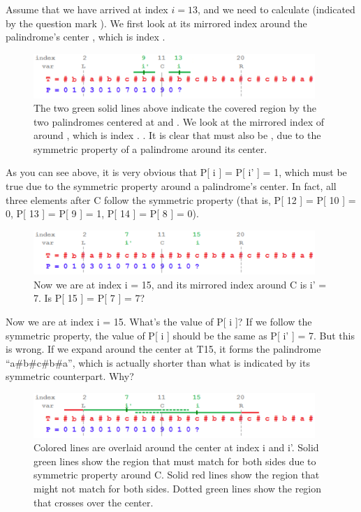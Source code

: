 Assume that we have arrived at index $i=13$, and we need to calculate
 (indicated by the question mark ). We first look at its
mirrored index  around the palindrome's center , which is
index .

\begin{figure}
\centering
\includegraphics[width=0.95\textwidth]{Images/figLCLngstPlndrmcSubstring2}
\caption{The two green solid lines above indicate the covered region by the
  two palindromes centered at  and . We look at the mirrored
  index of  around , which is index .
  . It is clear that  must also be , due
  to the symmetric property of a palindrome around its center.}
\end{figure}

As you can see above, it is very obvious that P[ i ] = P[ i' ] = 1, which
must be true due to the symmetric property around a palindrome's center. In
fact, all three elements after C follow the symmetric property (that is, P[
12 ] = P[ 10 ] = 0, P[ 13 ] = P[ 9 ] = 1, P[ 14 ] = P[ 8 ] = 0).

\begin{figure}
\centering
\includegraphics[width=0.95\textwidth]{Images/figLCLngstPlndrmcSubstring3}
\caption{Now we are at index i = 15, and its mirrored index around C is i' = 7. Is P[ 15 ] = P[ 7 ] = 7?}
\end{figure}

Now we are at index i = 15. What's the value of P[ i ]? If we follow the
symmetric property, the value of P[ i ] should be the same as P[ i' ] = 7.
But this is wrong. If we expand around the center at T15, it forms the
palindrome “a\#b\#c\#b\#a”, which is actually shorter than what is indicated by
its symmetric counterpart. Why?


\begin{figure}
\centering
\includegraphics[width=0.95\textwidth]{Images/figLCLngstPlndrmcSubstring4}
Colored lines are overlaid around the center at index i and i'. Solid green lines show the region that must match for both sides due to symmetric property around C. Solid red lines show the region that might not match for both sides. Dotted green lines show the region that crosses over the center.
\caption{}
\end{figure}

